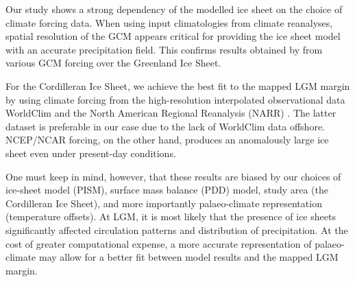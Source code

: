 \conclusions
\label{sec:concl}

Our study shows a strong dependency of the modelled ice sheet on the choice of climate forcing data. When using input climatologies from climate reanalyses, spatial resolution of the GCM appears critical for providing the ice sheet model with an accurate precipitation field. This confirms results obtained by \citet{quiquet-etal-2012} from various GCM forcing over the Greenland Ice Sheet.

For the Cordilleran Ice Sheet, we achieve the best fit to the mapped LGM margin by \citet{dyke-2004} using climate forcing from the high-resolution interpolated observational data WorldClim \citep{data:worldclim} and the North American Regional Reanalysis (NARR) \citep{data:narr}. The latter dataset is preferable in our case due to the lack of WorldClim data offshore. NCEP/NCAR forcing, on the other hand, produces an anomalously large ice sheet even under present-day conditions. 

One must keep in mind, however, that these results are biased by our choices of ice-sheet model (PISM), surface mass balance (PDD) model, study area (the Cordilleran Ice Sheet), and more importantly palaeo-climate representation (temperature offsets). At LGM, it is most likely that the presence of ice sheets significantly affected circulation patterns and distribution of precipitation. At the cost of greater computational expense, a more accurate representation of palaeo-climate may allow for a better fit between model results and the mapped LGM margin.
